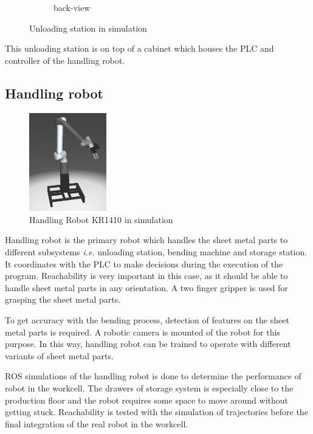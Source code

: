 \begin{figure}[h]
\begin{subfigure}{0.45\textwidth}
            \caption{back-view}
            \label{fig:unloading-station-back}
        \end{subfigure}
        \caption{Unloading station in simulation}
        \label{fig:unloading-station}
    \end{figure}

    This unloading station is on top of a cabinet which houses the PLC and controller of the handling robot.

\subsection{Handling robot}
\label{sub:handling-robot}
    \begin{figure}[h]
        \centering
        \includegraphics[width=0.3\textwidth]{figures/handling-robot-simulation.png}
        \caption{Handling Robot KR1410 in simulation}
        \label{fig:handling-robot-simulation}
    \end{figure}
    Handling robot is the primary robot which handles the sheet metal parts to different subsystems \textit{i.e.}
    unloading station, bending machine and storage station.
    It coordinates with the PLC to make decisions during the execution of the program. Reachability
    is very important in this case, as it should be able to handle sheet metal parts in any orientation.
    A two finger gripper is used for grasping the sheet metal parts.
    
    To get accuracy with the bending process, detection of features on the sheet metal parts is required.
    A robotic camera is mounted of the robot for this purpose. In this way, handling robot can be trained 
    to operate with different variants of sheet metal parts.

    ROS simulations of the handling robot is done to determine the performance of robot in the workcell.
    The drawers of storage system is especially close
    to the production floor and the robot requires some space to move around without getting stuck. 
    Reachability is tested with the simulation of trajectories before the final integration of the real robot
    in the workcell.


